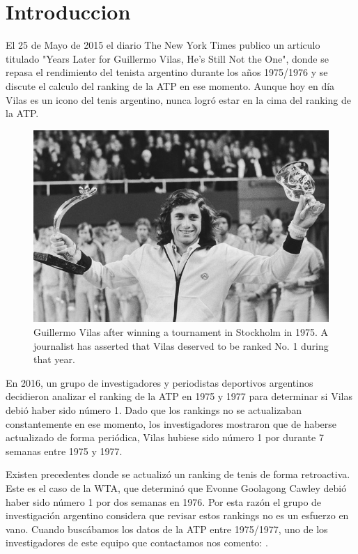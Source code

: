 \section{Introduccion}

El 25 de Mayo de 2015 el diario The New York Times publico un articulo titulado "Years Later for Guillermo Vilas, He's Still Not the One", donde se repasa el rendimiento del tenista argentino durante los años 1975/1976 y se discute el calculo del ranking de la ATP en ese momento. Aunque hoy en día Vilas es un icono del tenis argentino, nunca logró estar en la cima del ranking de la ATP.

\begin{figure}[H]
  \centering
  \includegraphics[scale=6]{images/nyt}
  \caption{Guillermo Vilas after winning a tournament in Stockholm in 1975. A journalist has asserted that Vilas deserved to be ranked No. 1 during that year. }
\end{figure}

En 2016, un grupo de investigadores y periodistas deportivos argentinos decidieron analizar el ranking de la ATP en 1975 y 1977 para determinar si Vilas debió haber sido número 1. Dado que los rankings no se actualizaban constantemente en ese momento, los investigadores mostraron que de haberse actualizado de forma periódica, Vilas hubiese sido número 1 por durante 7 semanas entre 1975 y 1977.

Existen precedentes donde se actualizó un ranking de tenis de forma retroactiva. Este es el caso de la WTA, que determinó que Evonne Goolagong Cawley debió haber sido número 1 por dos semanas en 1976. Por esta razón el grupo de investigación argentino considera que revisar estos rankings no es un esfuerzo en vano. Cuando buscábamos los datos de la ATP entre 1975/1977, uno de los investigadores de este equipo que contactamos nos comento: .

